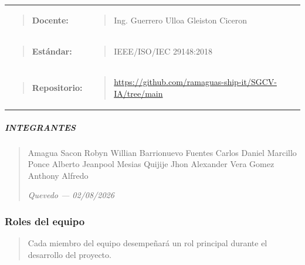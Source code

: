 \documentclass[
]{article}
\begin{document}
{\begin{longtable}[]{@{}
  >{\raggedright\arraybackslash}p{}
  >{\raggedright\arraybackslash}p{}@{}}
\begin{minipage}[t]{\linewidth}\raggedright
\begin{quote}
\textbf{Docente:}
\end{quote}
\end{minipage} & \begin{minipage}[t]{\linewidth}\raggedright
\begin{quote}
Ing. Guerrero Ulloa Gleiston Ciceron
\end{quote}
\end{minipage} \\
\begin{minipage}[t]{\linewidth}\raggedright
\begin{quote}
\textbf{Estándar:}
\end{quote}
\end{minipage} & \begin{minipage}[t]{\linewidth}\raggedright
\begin{quote}
IEEE/ISO/IEC 29148:2018
\end{quote}
\end{minipage} \\
\begin{minipage}[t]{\linewidth}\raggedright
\begin{quote}
\textbf{Repositorio:}
\end{quote}
\end{minipage} & \begin{minipage}[t]{\linewidth}\raggedright
\begin{quote}
\url{https://github.com/ramaguas-ship-it/SGCV-IA/tree/main}
\end{quote}
\end{minipage} \\
\end{longtable}
}

\subparagraph{INTEGRANTES}\label{integrantes}

\begin{quote}
Amagua Sacon Robyn Willian Barrionuevo Fuentes Carlos Daniel Marcillo
Ponce Alberto Jeanpool Mesias Quijije Jhon Alexander Vera Gomez Anthony
Alfredo

\emph{Quevedo --- 02/08/2026}
\end{quote}

\subsubsection{Roles del equipo}\label{roles-del-equipo}

\begin{quote}
Cada miembro del equipo desempeñará un rol principal durante el
desarrollo del proyecto.
\end{quote}
\end{document}
